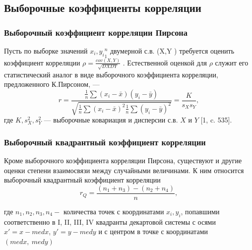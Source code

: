 \documentclass[a4paper]{article}
\begin{document}
        \subsection{Выборочные коэффициенты корреляции}
            \subsubsection{Выборочный коэффициент корреляции Пирсона}
                \noindent Пусть по выборке значений ${x_{i},y_{i}}^{n}_{1}$ двумерной с.в. (X,Y ) требуется оценить коэффициент корреляции $\rho = \frac{cov(X,Y)}{\sqrt{DXDY}}$ . Естественной оценкой для $\rho$ служит его статистический аналог в виде выборочного коэффициента корреляции, предложенного К.Пирсоном, —
                \begin{equation}
                    r = \frac{
                        \frac{1}{n}\sum{(x_{i} - \bar{x})(y_{i}-\bar{y})}
                    }{
                    \sqrt{\frac{1}{n}\sum{(x_{i} - \bar{x})^{2}}\frac{1}{n}\sum{(y_{i} - \bar{y})^{2}}}
                    }=\frac{K}{s_{X}s_{Y}},
                    \label{r}
                \end{equation}
                где $K,s^{2}_{X},s^{2}_{Y}$ — выборочные ковариация и дисперсии с.в. $X$ и $Y$ [1, c. 535].


            \subsubsection{Выборочный квадрантный коэффициент корреляции}
                \noindent Кроме выборочного коэффициента корреляции Пирсона, существуют и другие оценки степени взаимосвязи между случайными величинами. К ним относится выборочный квадрантный коэффициент корреляции
                \begin{equation}
                    r_{Q} = \frac{(n_{1} + n_{3}) - (n_{2} + n_{4})}{n},
                    \label{rQ}
                \end{equation}

                \noindent где $n_1, n_2, n_3, n_4 - $ количества точек с координатами $x_i, y_i$, попавшими соответственно в I, II, III, IV квадранты декартовой системы с осями $x'=x-med x$, $y'=y-med y$ и с центром в точке с координатами $(med x,~med y)$
\end{document}
